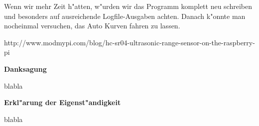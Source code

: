 \documentclass[a4paper,12pt]{article}
\begin{document}
Wenn wir mehr Zeit h"atten, w"urden wir das Programm komplett neu schreiben und besonders auf ausreichende Logfile-Ausgaben achten.
Danach k"onnte man nocheinmal versuchen, das Auto Kurven fahren zu lassen.

\bigskip


\begin{thebibliography}{99}
	\itemsep-2pt \small
	 http://www.modmypi.com/blog/hc-sr04-ultrasonic-range-sensor-on-the-raspberry-pi
\end{thebibliography}

\newpage


{\large\bf Danksagung}

\medskip

blabla

\bigskip


{\large\bf Erkl"arung der Eigenst"andigkeit}

\medskip

blabla
\end{document}
